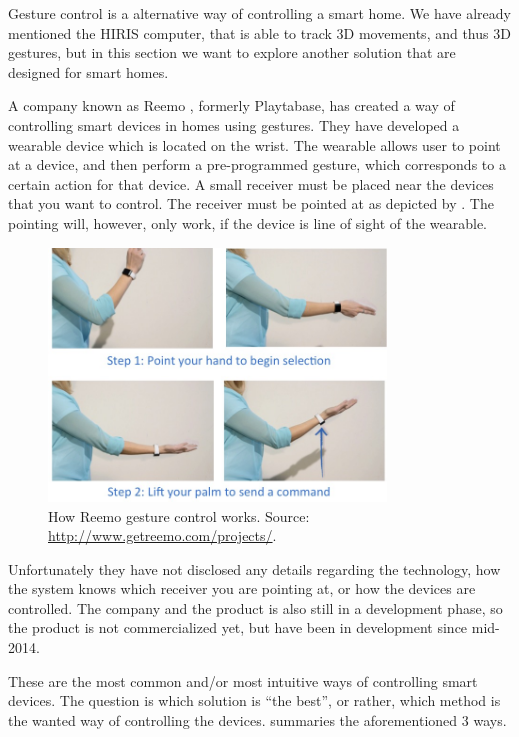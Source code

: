 Gesture control is a alternative way of controlling a smart home. 
We have already mentioned the HIRIS computer, 
that is able to track 3D movements, and thus 3D gestures, 
but in this section we want to explore another solution that are designed for smart homes. 

A company known as Reemo \cite{Reemo}, formerly Playtabase, 
has created a way of controlling smart devices in homes using gestures. 
They have developed a wearable device which is located on the wrist. 
The wearable allows user to point at a device, 
and then perform a pre-programmed gesture, 
which corresponds to a certain action for that device. 
A small receiver must be placed near the devices that you want to control. 
The receiver must be pointed at as depicted by .
The pointing will, however, only work, 
if the device is line of sight of the wearable. 

\begin{figure}[!htb]
    \centering
    \includegraphics[width=0.8\textwidth]{images/Reemo}
    \caption{How Reemo gesture control works. Source: \url{http://www.getreemo.com/projects/}.}
    \label{fig:reemo}
\end{figure}

Unfortunately they have not disclosed any details regarding the technology, 
how the system knows which receiver you are pointing at, 
or how the devices are controlled. 
The company and the product is also still in a development phase, 
so the product is not commercialized yet, 
but have been in development since mid-2014.

These are the most common and/or most intuitive ways of controlling smart devices. 
The question is which solution is ``the best'', 
or rather, which method is the wanted way of controlling the devices.
 summaries the aforementioned 3 ways. 

